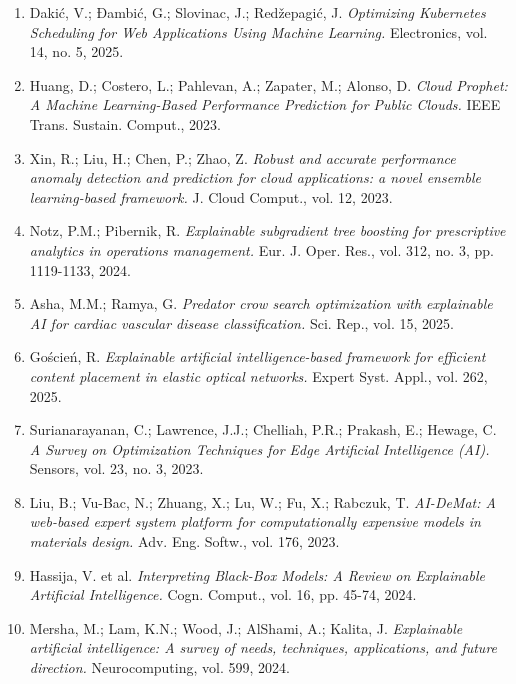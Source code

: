 \begin{enumerate}
    \item Dakić, V.; Đambić, G.; Slovinac, J.; Redžepagić, J. \textit{Optimizing Kubernetes Scheduling for Web Applications Using Machine Learning.} Electronics, vol. 14, no. 5, 2025.
    
    \item Huang, D.; Costero, L.; Pahlevan, A.; Zapater, M.; Alonso, D. \textit{Cloud Prophet: A Machine Learning-Based Performance Prediction for Public Clouds.} IEEE Trans. Sustain. Comput., 2023.
    
    \item Xin, R.; Liu, H.; Chen, P.; Zhao, Z. \textit{Robust and accurate performance anomaly detection and prediction for cloud applications: a novel ensemble learning-based framework.} J. Cloud Comput., vol. 12, 2023.
    
    \item Notz, P.M.; Pibernik, R. \textit{Explainable subgradient tree boosting for prescriptive analytics in operations management.} Eur. J. Oper. Res., vol. 312, no. 3, pp. 1119-1133, 2024.
    
    \item Asha, M.M.; Ramya, G. \textit{Predator crow search optimization with explainable AI for cardiac vascular disease classification.} Sci. Rep., vol. 15, 2025.
    
    \item Goścień, R. \textit{Explainable artificial intelligence-based framework for efficient content placement in elastic optical networks.} Expert Syst. Appl., vol. 262, 2025.
    
    \item Surianarayanan, C.; Lawrence, J.J.; Chelliah, P.R.; Prakash, E.; Hewage, C. \textit{A Survey on Optimization Techniques for Edge Artificial Intelligence (AI).} Sensors, vol. 23, no. 3, 2023.
    
    \item Liu, B.; Vu-Bac, N.; Zhuang, X.; Lu, W.; Fu, X.; Rabczuk, T. \textit{AI-DeMat: A web-based expert system platform for computationally expensive models in materials design.} Adv. Eng. Softw., vol. 176, 2023.
    
    \item Hassija, V. et al. \textit{Interpreting Black-Box Models: A Review on Explainable Artificial Intelligence.} Cogn. Comput., vol. 16, pp. 45-74, 2024.
    
    \item Mersha, M.; Lam, K.N.; Wood, J.; AlShami, A.; Kalita, J. \textit{Explainable artificial intelligence: A survey of needs, techniques, applications, and future direction.} Neurocomputing, vol. 599, 2024.
    

\end{enumerate}
